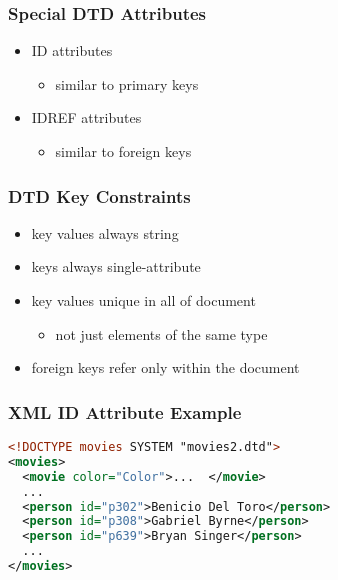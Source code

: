 \documentclass[dvipsnames]{beamer}
\theoremstyle{plain}
\begin{document}
\begin{frame}
  \frametitle{Special DTD Attributes}

  \begin{itemize}
    \item ID attributes
    \begin{itemize}
      \item similar to primary keys
    \end{itemize}

    \pause
    \item IDREF attributes
    \begin{itemize}
      \item similar to foreign keys
    \end{itemize}
  \end{itemize}
\end{frame}

\begin{frame}
  \frametitle{DTD Key Constraints}

  \begin{itemize}
    \item key values always string

    \pause
    \item keys always single-attribute

    \pause
    \item key values unique in all of document
    \begin{itemize}
      \item not just elements of the same type
    \end{itemize}

    \pause
    \item foreign keys refer only within the document
  \end{itemize}
\end{frame}

\begin{frame}[fragile]
  \frametitle{XML ID Attribute Example}

  \begin{example}[Movies]
    \begin{lstlisting}[language=XML]
<!DOCTYPE movies SYSTEM "movies2.dtd">
<movies>
  <movie color="Color">...  </movie>
  ...
  <person id="p302">Benicio Del Toro</person>
  <person id="p308">Gabriel Byrne</person>
  <person id="p639">Bryan Singer</person>
  ...
</movies>
    \end{lstlisting}
  \end{example}
\end{frame}
\end{document}
